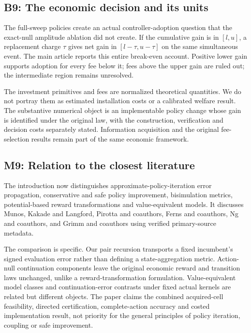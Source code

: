 \documentclass[ecta,nameyear,draft]{econsocart}
\begin{document}
\hypertarget{b9-the-economic-decision-and-its-units}{%
\subsection{B9: The economic decision and its
units}\label{b9-the-economic-decision-and-its-units}}

The full-sweep policies create an actual controller-adoption question
that the exact-null amplitude ablation did not create. If the cumulative
gain is in \([l,u]\), a replacement charge \(\tau\) gives net gain in
\([l-\tau,u-\tau]\) on the same simultaneous event. The main article
reports this entire break-even account. Positive lower gain supports
adoption for every fee below it; fees above the upper gain are ruled
out; the intermediate region remains unresolved.

The investment primitives and fees are normalized theoretical
quantities. We do not portray them as estimated installation costs or a
calibrated welfare result. The substantive numerical object is an
implementable policy change whose gain is identified under the original
law, with the construction, verification and decision costs separately
stated. Information acquisition and the original fee-selection results
remain part of the same economic framework.

\hypertarget{m9-relation-to-the-closest-literature}{%
\subsection{M9: Relation to the closest
literature}\label{m9-relation-to-the-closest-literature}}

The introduction now distinguishes approximate-policy-iteration error
propagation, conservative and safe policy improvement, bisimulation
metrics, potential-based reward transformations and value-equivalent
models. It discusses Munos, Kakade and Langford, Pirotta and coauthors,
Ferns and coauthors, Ng and coauthors, and Grimm and coauthors using
verified primary-source metadata.

The comparison is specific. Our pair recursion transports a fixed
incumbent's signed evaluation error rather than defining a
state-aggregation metric. Action-null continuation components leave the
original economic reward and transition laws unchanged, unlike a
reward-transformation formulation. Value-equivalent model classes and
continuation-error contrasts under fixed actual kernels are related but
different objects. The paper claims the combined acquired-cell
feasibility, directed certification, complete-action accuracy and costed
implementation result, not priority for the general principles of policy
iteration, coupling or safe improvement.
\end{document}
